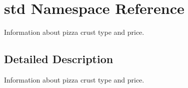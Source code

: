 \hypertarget{namespacestd}{
\section{std Namespace Reference}
\label{namespacestd}
}
Information about pizza crust type and price.  




\subsection{Detailed Description}
Information about pizza crust type and price. 
